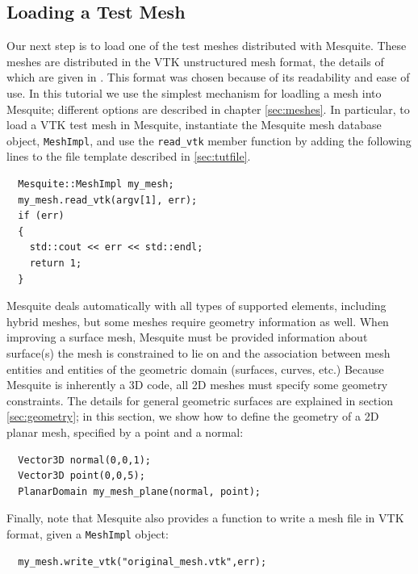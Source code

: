 \subsection{Loading a Test Mesh}
\label{sec:tutMesh}
Our next step is to load one of the test meshes distributed with
Mesquite.  These meshes are distributed in the VTK unstructured mesh
format, the details of which are given in \cite{VTKbook, VTKuml}. This
format was chosen because of its readability and ease of use.
In this tutorial we use
the simplest mechanism for loadling a mesh into Mesquite; different
options are described in chapter \ref{sec:meshes}.  In particular, to
load a VTK test mesh in Mesquite, instantiate the Mesquite mesh
database object,
\texttt{MeshImpl}, and use the \texttt{read\_vtk} member function by
adding the following lines to the file template described in
\ref{sec:tutfile}.
\begin{verbatim}
  Mesquite::MeshImpl my_mesh;
  my_mesh.read_vtk(argv[1], err); 
  if (err) 
  {
    std::cout << err << std::endl;
    return 1;
  }
\end{verbatim}
Mesquite deals automatically with all types of supported elements,
including hybrid meshes, but some meshes require geometry information
as well.  When improving a surface mesh, Mesquite must be provided information
about surface(s) the mesh is constrained to lie on and the association between
mesh entities and entities of the geometric domain (surfaces, curves, etc.)
Because Mesquite is inherently a 3D code, all 2D meshes must specify some
geometry constraints.  The details
for general geometric surfaces are explained in section
\ref{sec:geometry}; in this section,
we show how to define the geometry of a 2D planar mesh, specified by a
point and a normal:
\begin{verbatim}
  Vector3D normal(0,0,1);
  Vector3D point(0,0,5);
  PlanarDomain my_mesh_plane(normal, point);
\end{verbatim}

Finally, note that Mesquite also provides a function to write a mesh
file in VTK format, given a \texttt{MeshImpl} object:
\begin{verbatim}
  my_mesh.write_vtk("original_mesh.vtk",err); 
\end{verbatim}


